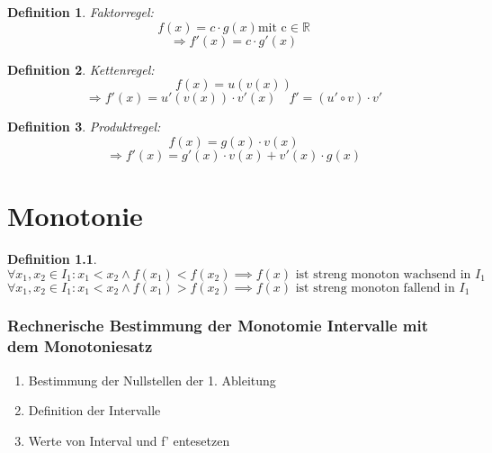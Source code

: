 \documentclass{scrbook}
\newtheorem{definition}{Definition}
\begin{document}
\begin{definition}Faktorregel:
\[f(x) = c \cdot g(x) \text{mit c} \in \mathbb{R}\]
\[ \Rightarrow f'(x) = c \cdot g'(x)\]
\end{definition}

\begin{definition} Kettenregel: 
\[ f(x) = u(v(x))\]
\[ \Rightarrow f'(x) = u'(v(x))\cdot v'(x) \quad f' = (u' \circ v)\cdot v'\]
\end{definition}

\begin {definition} Produktregel:
\[f(x) = g(x)\cdot v(x)\]
\[\Rightarrow f'(x) = g'(x)\cdot v(x) + v'(x)\cdot g(x)\]
\end{definition}

\chapter{Monotonie}

\begin{definition}
\[ \forall x_1, x_2 \in I_1: x_1 < x_2 \land f(x_1) < f(x_2) \implies f(x) \text{ ist streng monoton wachsend in }I_1\]
\[ \forall x_1, x_2 \in I_1: x_1 < x_2 \land f(x_1) > f(x_2) \implies f(x) \text{ ist streng monoton fallend in }I_1\]
\end{definition}

\subsection{Rechnerische Bestimmung der Monotomie Intervalle mit dem Monotoniesatz}
\begin{enumerate}
\item Bestimmung der Nullstellen der 1. Ableitung
\item Definition der Intervalle
\item Werte von Interval und f' entesetzen
\end{enumerate}
\end{document}
